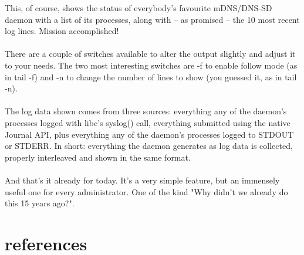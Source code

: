 \documentclass[titlepage]{article}
\begin{document}
This, of course, shows the status of everybody's favourite mDNS/DNS-SD daemon with a list of its processes, along with -- as promised -- the 10 most recent log lines. Mission accomplished!
\\
\\
There are a couple of switches available to alter the output slightly and adjust it to your needs. The two most interesting switches are -f to enable follow mode (as in tail -f) and -n to change the number of lines to show (you guessed it, as in tail -n).
\\
\\
The log data shown comes from three sources: everything any of the daemon's processes logged with libc's syslog() call, everything submitted using the native Journal API, plus everything any of the daemon's processes logged to STDOUT or STDERR. In short: everything the daemon generates as log data is collected, properly interleaved and shown in the same format.
\\
\\
And that's it already for today. It's a very simple feature, but an immensely useful one for every administrator. One of the kind "Why didn't we already do this 15 years ago?".
\section{references}
\nocite{*}


\end{document}
